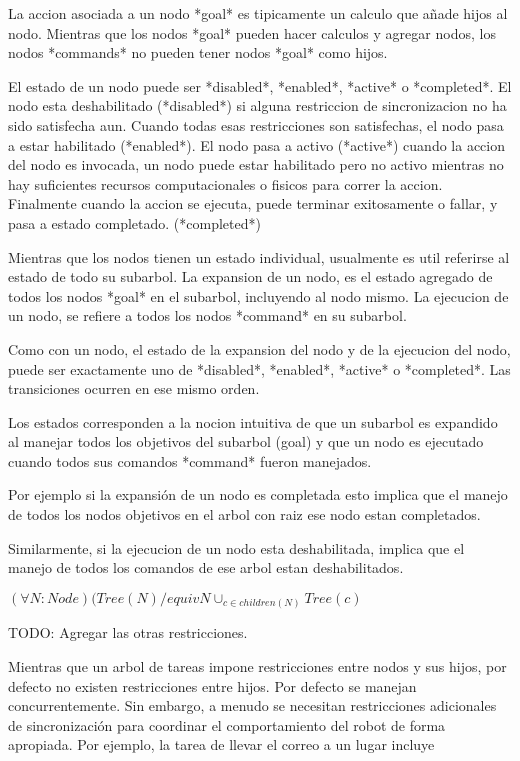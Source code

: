 La accion asociada a un nodo *goal* es tipicamente un calculo que añade
hijos al nodo. 
Mientras que los nodos *goal* pueden hacer calculos y agregar nodos, 
los nodos *commands* no pueden tener nodos *goal* como hijos.

El estado de un nodo puede ser *disabled*, *enabled*, *active* o *completed*.
El nodo esta deshabilitado (*disabled*) si alguna restriccion de sincronizacion
 no ha sido satisfecha aun.
Cuando todas esas restricciones son satisfechas, el nodo pasa a estar 
habilitado (*enabled*).
El nodo pasa a activo (*active*) cuando la accion del nodo es invocada, 
un nodo puede estar habilitado pero no activo mientras
no hay suficientes recursos computacionales o fisicos para correr la accion.
Finalmente cuando la accion se ejecuta, puede terminar exitosamente o fallar,
 y pasa a estado completado. (*completed*)

Mientras que los nodos tienen un estado individual, usualmente es util 
referirse al estado de todo su subarbol.
La expansion de un nodo, es el estado agregado de todos los nodos *goal* en el
 subarbol, incluyendo al nodo mismo.
La ejecucion de un nodo, se refiere a todos los nodos *command* en su subarbol.

Como con un nodo, el estado de la expansion del nodo y de la ejecucion del 
nodo, puede ser 
exactamente uno de *disabled*, *enabled*, *active* o *completed*. Las 
transiciones ocurren en ese mismo orden.

Los estados corresponden a la nocion intuitiva de que un subarbol es expandido
 al manejar todos los objetivos del subarbol (goal) y que
un nodo es ejecutado cuando todos sus comandos *command* fueron manejados.

Por ejemplo si la expansión de un nodo es completada esto implica que el 
manejo de todos los nodos objetivos en el arbol con raiz
ese nodo estan completados.

Similarmente, si la ejecucion de un nodo esta deshabilitada, implica que el 
manejo de todos los comandos de ese 
arbol estan deshabilitados.

$(\forall N: Node)(Tree(N) /equiv {N} \cup_{c \in children(N)} Tree (c)$

TODO: Agregar las otras restricciones.

Mientras que un arbol de tareas impone restricciones entre nodos y sus hijos, 
por defecto no existen restricciones entre 
hijos. Por defecto se manejan concurrentemente.
Sin embargo, a menudo se necesitan restricciones adicionales de sincronización
para coordinar el comportamiento del robot de forma apropiada.
Por ejemplo, la tarea de llevar  el correo a un lugar incluye 

